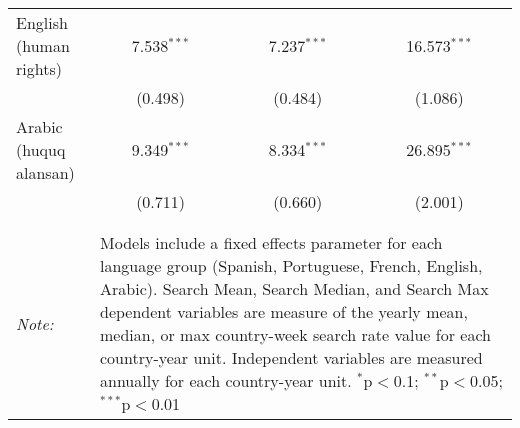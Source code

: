 \begin{table}[!htbp]
\begin{tabular}{@{\extracolsep{5pt}}lccc}
  English (human rights) & 7.538$^{***}$ & 7.237$^{***}$ & 16.573$^{***}$ \\ 
  & (0.498) & (0.484) & (1.086) \\ 
  Arabic (huquq alansan) & 9.349$^{***}$ & 8.334$^{***}$ & 26.895$^{***}$ \\ 
  & (0.711) & (0.660) & (2.001) \\ 
 \hline \\[-1.8ex] 
\hline 
\hline \\[-1.8ex] 
\textit{Note:}  & \multicolumn{3}{l}{\parbox[t]{8cm}{Models include a fixed effects parameter for each language group (Spanish, Portuguese, French, English, Arabic). Search Mean, Search Median, and Search Max dependent variables are measure of the yearly mean, median, or max country-week search rate value for each country-year unit. Independent variables are measured annually for each country-year unit. $^{*}$p$<$0.1; $^{**}$p$<$0.05; $^{***}$p$<$0.01}} \\ 
\end{tabular} 
\end{table} 
